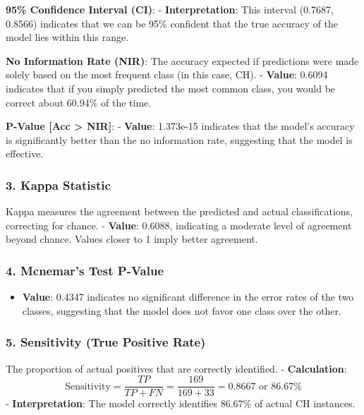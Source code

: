 \documentclass[
]{article}
\providecommand{\tightlist}{%
  \setlength{\itemsep}{0pt}\setlength{\parskip}{0pt}}
\begin{document}
\textbf{95\% Confidence Interval (CI)}: - \textbf{Interpretation}: This
interval (0.7687, 0.8566) indicates that we can be 95\% confident that
the true accuracy of the model lies within this range.

\textbf{No Information Rate (NIR)}: The accuracy expected if predictions
were made solely based on the most frequent class (in this case, CH). -
\textbf{Value}: 0.6094 indicates that if you simply predicted the most
common class, you would be correct about 60.94\% of the time.

\textbf{P-Value {[}Acc \textgreater{} NIR{]}}: - \textbf{Value}:
1.373e-15 indicates that the model's accuracy is significantly better
than the no information rate, suggesting that the model is effective.

\hypertarget{kappa-statistic}{%
\subsubsection{\texorpdfstring{3. \textbf{Kappa
Statistic}}{3. Kappa Statistic}}\label{kappa-statistic}}

Kappa measures the agreement between the predicted and actual
classifications, correcting for chance. - \textbf{Value}: 0.6088,
indicating a moderate level of agreement beyond chance. Values closer to
1 imply better agreement.

\hypertarget{mcnemars-test-p-value}{%
\subsubsection{\texorpdfstring{4. \textbf{Mcnemar's Test
P-Value}}{4. Mcnemar's Test P-Value}}\label{mcnemars-test-p-value}}

\begin{itemize}
\tightlist
\item
  \textbf{Value}: 0.4347 indicates no significant difference in the
  error rates of the two classes, suggesting that the model does not
  favor one class over the other.
\end{itemize}

\hypertarget{sensitivity-true-positive-rate}{%
\subsubsection{\texorpdfstring{5. \textbf{Sensitivity (True Positive
Rate)}}{5. Sensitivity (True Positive Rate)}}\label{sensitivity-true-positive-rate}}

The proportion of actual positives that are correctly identified. -
\textbf{Calculation}: \[
  \text{Sensitivity} = \frac{TP}{TP + FN} = \frac{169}{169 + 33} = 0.8667 \text{ or } 86.67\%
  \] - \textbf{Interpretation}: The model correctly identifies 86.67\%
of actual CH instances.
\end{document}
